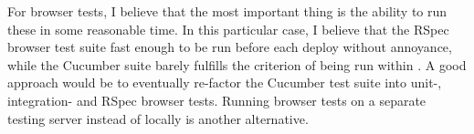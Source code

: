 For browser tests, I believe that the most important thing is the ability to
run these in some reasonable time. In this particular case, I believe
that the RSpec browser test suite fast enough to be run before each
deploy without annoyance, while the Cucumber suite barely fulfills the
criterion of being run within . A good approach
would be to eventually re-factor the Cucumber test suite into unit-,
integration- and RSpec browser tests. Running browser tests on a
separate testing server instead of locally is another alternative.\\

